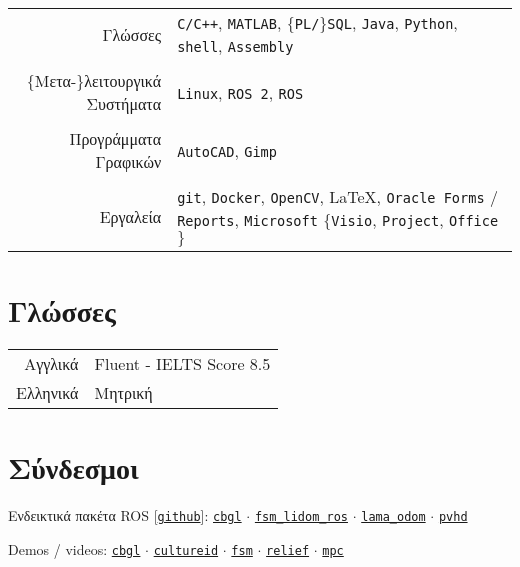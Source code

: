 \documentclass[a4paper,10pt,twoside]{article}
\begin{document}
\begin{tabular}{rp{9cm}}
  Γλώσσες & \texttt{C/C++}, \texttt{MATLAB}, $\{$\texttt{PL/}$\}$\texttt{SQL}, \texttt{Java}, \texttt{Python}, \texttt{shell}, \texttt{Assembly}\\
&\\
  $\{$Μετα-$\}$λειτουργικά Συστήματα & \texttt{Linux}, \texttt{ROS 2}, \texttt{ROS}  \\
&\\
  Προγράμματα Γραφικών & \texttt{AutoCAD}, \texttt{Gimp}\\
&\\
  Εργαλεία & \texttt{git}, \texttt{Docker}, \texttt{OpenCV}, \LaTeX, \texttt{Oracle Forms} / \texttt{Reports}, \texttt{Microsoft} $\{$\texttt{Visio}, \texttt{Project}, \texttt{Office}$\}$
\end{tabular}



\section{Γλώσσες}

\begin{tabular}{rp{12cm}}
Αγγλικά & Fluent - IELTS Score 8.5\\
Ελληνικά & Μητρική
\end{tabular}

\section{Σύνδεσμοι}

Ενδεικτικά πακέτα ROS [\href{https://github.com/li9i}{\texttt{github}}]:
\href{https://github.com/li9i/cbgl}{\texttt{cbgl}} $\cdot$
\href{https://github.com/li9i/fsm\_lidom\_ros}{\texttt{fsm\_lidom\_ros}} $\cdot$
\href{https://github.com/li9i/lama\_odom}{\texttt{lama\_odom}} $\cdot$
\href{https://github.com/li9i/pandora\_vision\_2014/tree/hydro-devel/pandora\_vision\_hole\_detector}{\texttt{pvhd}}

Demos / videos: \href{https://www.youtube.com/watch?v=xaDKjI0WkDc}{\texttt{cbgl}} $\cdot$ \href{https://cultureid.web.auth.gr/?page\_id=200&lang=en}{\texttt{cultureid}} $\cdot$ \href{https://www.youtube.com/watch?v=hB4qsHCEXGI}{\texttt{fsm}} $\cdot$ \href{https://relief.web.auth.gr/}{\texttt{relief}} $\cdot$ \href{https://www.youtube.com/watch?v=937OZez1iN8}{\texttt{mpc}}
\\
\end{document}

